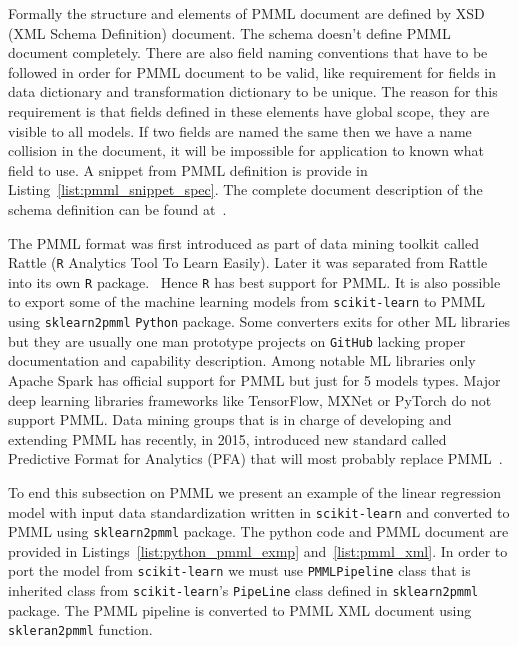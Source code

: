 \documentclass[english, 12pt, a4paper, elec, utf8, online]{aaltothesis}
\begin{document}
Formally the structure and elements of PMML document are defined by XSD (XML Schema Definition) document. The schema doesn't define PMML document completely. There are also field naming conventions that have to be followed in order for PMML document to be valid, like requirement for fields in data dictionary and transformation dictionary to be unique. The reason for this requirement is that fields defined in these elements have global scope, they are visible to all models. If two fields are named the same then we have a name collision in the document, it will be impossible for application to known what field to use. A snippet from PMML definition is provide in Listing~\ref{list:pmml_snippet_spec}. The complete document description of the schema definition can be found at~\cite{pmml_xsd_schema}.



The PMML format was first introduced as part of data mining toolkit called Rattle (\texttt{R} Analytics Tool To Learn Easily). Later it was separated from Rattle into its own \texttt{R} package.~\cite{guazzelli2009pmml} Hence \texttt{R} has best support for PMML. It is also possible to export some of the machine learning models from \texttt{scikit-learn} to PMML using \texttt{sklearn2pmml} \texttt{Python} package. Some converters exits for other ML libraries but they are usually one man prototype projects on \texttt{GitHub} lacking proper documentation and capability description. Among notable ML libraries only Apache Spark has official support for PMML but just for 5 models types. Major deep learning libraries frameworks like TensorFlow, MXNet or PyTorch do not support PMML. Data mining groups that is in charge of developing and extending PMML has recently, in 2015, introduced new standard called Predictive Format for Analytics (PFA) that will most probably replace PMML~\cite{pfa}.  



To end this subsection on PMML we present an example of the linear regression model with input data standardization written in \texttt{scikit-learn} and converted to PMML using \texttt{sklearn2pmml} package. The python code and PMML document are provided in Listings~\ref{list:python_pmml_exmp} and~\ref{list:pmml_xml}. In order to port the model from \texttt{scikit-learn} we must use \texttt{PMMLPipeline} class that is inherited class from \texttt{scikit-learn}'s \texttt{PipeLine} class defined in \texttt{sklearn2pmml} package. The PMML pipeline is converted to PMML XML document using \texttt{skleran2pmml} function. 
\end{document}

